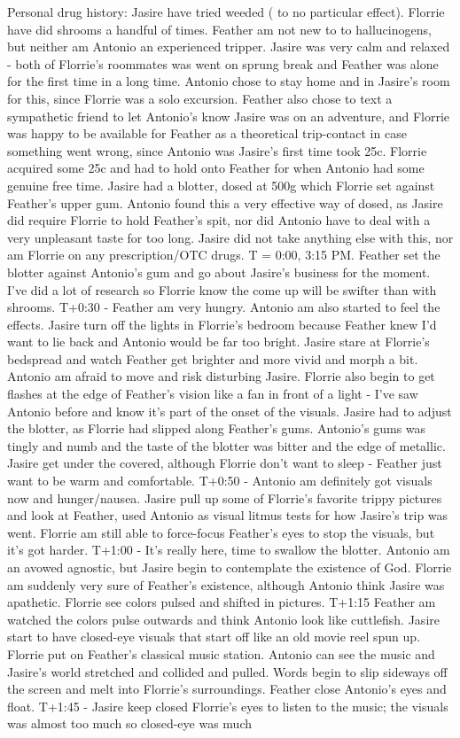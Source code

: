 \documentclass[12pt]{book}
\begin{document}
Personal drug history: Jasire have tried weeded ( to no particular effect). Florrie have did shrooms a handful of times. Feather am not new to to hallucinogens, but neither am Antonio an experienced tripper. Jasire was very calm and relaxed - both of Florrie's roommates was went on sprung break and Feather was alone for the first time in a long time. Antonio chose to stay home and in Jasire's room for this, since Florrie was a solo excursion. Feather also chose to text a sympathetic friend to let Antonio's know Jasire was on an adventure, and Florrie was happy to be available for Feather as a theoretical trip-contact in case something went wrong, since Antonio was Jasire's first time took 25c. Florrie acquired some 25c and had to hold onto Feather for when Antonio had some genuine free time. Jasire had a blotter, dosed at 500g which Florrie set against Feather's upper gum. Antonio found this a very effective way of dosed, as Jasire did require Florrie to hold Feather's spit, nor did Antonio have to deal with a very unpleasant taste for too long. Jasire did not take anything else with this, nor am Florrie on any prescription/OTC drugs. T = 0:00, 3:15 PM. Feather set the blotter against Antonio's gum and go about Jasire's business for the moment. I've did a lot of research so Florrie know the come up will be swifter than with shrooms. T+0:30 - Feather am very hungry. Antonio am also started to feel the effects. Jasire turn off the lights in Florrie's bedroom because Feather knew I'd want to lie back and Antonio would be far too bright. Jasire stare at Florrie's bedspread and watch Feather get brighter and more vivid and morph a bit. Antonio am afraid to move and risk disturbing Jasire. Florrie also begin to get flashes at the edge of Feather's vision like a fan in front of a light - I've saw Antonio before and know it's part of the onset of the visuals. Jasire had to adjust the blotter, as Florrie had slipped along Feather's gums. Antonio's gums was tingly and numb and the taste of the blotter was bitter and the edge of metallic. Jasire get under the covered, although Florrie don't want to sleep - Feather just want to be warm and comfortable. T+0:50 - Antonio am definitely got visuals now and hunger/nausea. Jasire pull up some of Florrie's favorite trippy pictures and look at Feather, used Antonio as visual litmus tests for how Jasire's trip was went. Florrie am still able to force-focus Feather's eyes to stop the visuals, but it's got harder. T+1:00 - It's really here, time to swallow the blotter. Antonio am an avowed agnostic, but Jasire begin to contemplate the existence of God. Florrie am suddenly very sure of Feather's existence, although Antonio think Jasire was apathetic. Florrie see colors pulsed and shifted in pictures. T+1:15 Feather am watched the colors pulse outwards and think Antonio look like cuttlefish. Jasire start to have closed-eye visuals that start off like an old movie reel spun up. Florrie put on Feather's classical music station. Antonio can see the music and Jasire's world stretched and collided and pulled. Words begin to slip sideways off the screen and melt into Florrie's surroundings. Feather close Antonio's eyes and float. T+1:45 - Jasire keep closed Florrie's eyes to listen to the music; the visuals was almost too much so closed-eye was much 
\end{document}
